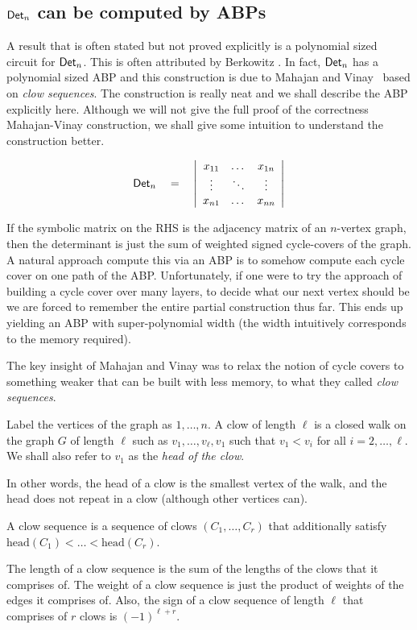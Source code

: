 \subsection{$\mathsf{Det}_n$ can be computed by ABPs}

A result that is often stated but not proved explicitly is a polynomial sized circuit for $\mathsf{Det}_n$. This is often attributed by Berkowitz \cite{Berk84}. In fact, $\mathsf{Det}_n$ has a polynomial sized ABP and this construction is due to Mahajan and Vinay~\cite{mv97} based on \emph{clow sequences}. The construction is really neat and we shall describe the ABP explicitly here. Although we will not give the full proof of the correctness Mahajan-Vinay construction, we shall give some intuition to understand the construction better. 

\[
\mathsf{Det}_n \quad = \quad \left|\begin{array}{ccc}
x_{11} & \dots & x_{1n}\\
\vdots & \ddots & \vdots \\
x_{n1} & \dots & x_{nn}
\end{array}
\right|\]

If the symbolic matrix on the RHS is the adjacency matrix of an $n$-vertex graph, then the determinant is just the sum of weighted signed cycle-covers of the graph. A natural approach compute this via an ABP is to somehow compute each cycle cover on one path of the ABP. Unfortunately, if one were to try the \naive approach of building a cycle cover over many layers, to decide what our next vertex should be we are forced to remember the entire partial construction thus far. This ends up yielding an ABP with super-polynomial width (the width intuitively corresponds to the memory required). 

The key insight of Mahajan and Vinay was to relax the notion of cycle covers to something weaker that can be built with less memory, to what they called \emph{clow sequences}. 

\begin{definition}
Label the vertices of the graph as $1,\dots, n$. A clow  of length $\ell$ is a closed walk on the graph $G$ of length $\ell$ such as $v_1,\dots, v_\ell,v_1$ such that $v_1 < v_i$ for all $i=2,\dots, \ell$. We shall also refer to $v_1$ as the \emph{head of the clow}. 

In other words, the head of a clow is the smallest vertex of the walk, and the head does not repeat in a clow (although other vertices can). 

A clow sequence is a sequence of clows $(C_1,\dots, C_r)$ that additionally satisfy $\mathrm{head}(C_1) < \dots < \mathrm{head}(C_r)$. 

The length of a clow sequence is the sum of the lengths of the clows that it comprises of. The weight of a clow sequence is just the product of weights of the edges it comprises of. Also, the sign of a clow sequence of length $\ell$ that comprises of $r$ clows is $(-1)^{\ell + r}$. 
\end{definition}

